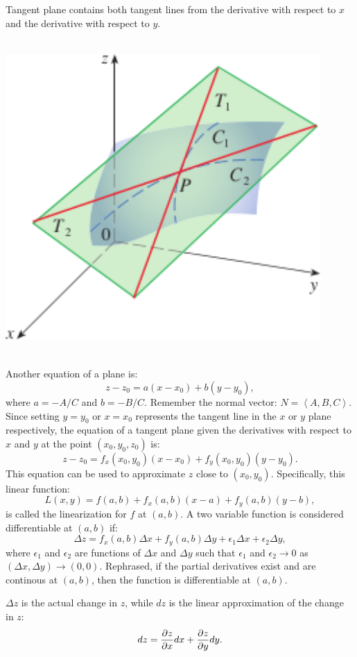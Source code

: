 \documentclass{article}
\begin{document}
Tangent plane contains both tangent lines from the derivative with respect to $x$
and the derivative with respect to $y$.  
\begin{center}
    \includegraphics[width=12cm,height=12cm, keepaspectratio]{TangentPlane.png}
\end{center}

Another equation of a plane is:
\[z-z_0=a(x-x_0) + b(y-y_0),\]
where $a = -A/C$ and $b = -B/C$. Remember the normal vector:
 $N = \left\langle A, B, C \right\rangle.$ Since setting $y=y_0$ or
 $x=x_0$ represents the tangent line in the $x$ or $y$ plane respectively, 
 the equation of a tangent plane given the derivatives with respect to $x$ and $y$
 at the point $(x_0, y_0, z_0)$ is: 
 \[z-z_0 = f_x(x_0, y_0)(x-x_0) + f_y(x_0, y_0)(y-y_0).\]
 This equation can be used to 
 approximate $z$ close to $(x_0, y_0)$. Specifically, this linear function:
 \[L(x,y) = f(a,b) +f_x(a,b)(x-a)+f_y(a,b)(y-b),\] is called
 the linearization for $f$ at $(a,b).$ A two variable function is
considered differentiable at $(a,b)$ if:
\[\Delta z = f_x(a,b)\Delta x + f_y(a,b)\Delta y + \epsilon_1\Delta x + \epsilon_2\Delta y,\]
where $\epsilon_1$ and $\epsilon_2$ are functions of $\Delta x$ and $\Delta y$
such that $\epsilon_1$ and $\epsilon_2 \to 0$ as $(\Delta x,\Delta y) \to (0,0).$
Rephrased, if the partial derivatives exist and are continous at $(a,b)$,
then the function is differentiable at $(a,b)$. 

$\Delta z$ is the 
actual change in $z$, while $dz$ is the linear approximation of the change in $z$:
\[dz = \pdv{z}{x}dx + \pdv{z}{y}dy.\]
\end{document}
